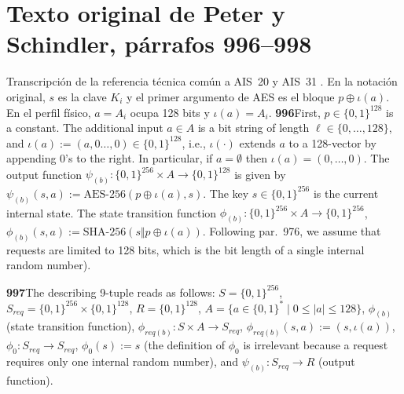 \documentclass[11pt,a4paper]{article}
\begin{document}
\section{Texto original de Peter y Schindler, párrafos 996--998}\label{app:bsi}
Transcripción de la referencia técnica común a AIS~20 y AIS~31 \cite[sec.~5.2.2, párrs.~996--998, pp.~203--204]{ais}. En la notación original, \(s\) es la clave \(K_i\) y el primer argumento de AES es el bloque \(p\oplus\iota(a)\). En el perfil físico, \(a=A_i\) ocupa 128 bits y \(\iota(a)=A_i\).
\begingroup
\small
\setlength{\parskip}{6pt}
\textbf{996} First, \(p\in\{0,1\}^{128}\) is a constant. The additional input \(a\in A\) is a bit string of length \(\ell\in\{0,\ldots,128\}\), and \(\iota(a):=(a,0\ldots,0)\in\{0,1\}^{128}\), i.e., \(\iota(\cdot)\) extends \(a\) to a 128-vector by appending 0's to the right. In particular, if \(a=\emptyset\) then \(\iota(a)=(0,\ldots,0)\). The output function \(\psi_{(b)}:\{0,1\}^{256}\times A\to\{0,1\}^{128}\) is given by \(\psi_{(b)}(s,a):=\text{AES-256}(p\oplus\iota(a),s)\). The key \(s\in\{0,1\}^{256}\) is the current internal state. The state transition function \(\phi_{(b)}:\{0,1\}^{256}\times A\to\{0,1\}^{256}\), \(\phi_{(b)}(s,a):=\text{SHA-256}(s\Vert p\oplus\iota(a))\). Following par.~976, we assume that requests are limited to 128 bits, which is the bit length of a single internal random number).

\textbf{997}\quad The describing 9-tuple reads as follows: \(S=\{0,1\}^{256}\), \(S_{\mathit{req}}=\{0,1\}^{256}\times\{0,1\}^{128}\), \(R=\{0,1\}^{128}\), \(A=\{a\in\{0,1\}^{*}\mid 0\le |a|\le 128\}\), \(\phi_{(b)}\) (state transition function), \(\phi_{\mathit{req}(b)}:S\times A\to S_{\mathit{req}}\), \(\phi_{\mathit{req}(b)}(s,a):=(s,\iota(a))\), \(\phi_0:S_{\mathit{req}}\to S_{\mathit{req}}\), \(\phi_0(s):=s\) (the definition of \(\phi_0\) is irrelevant because a request requires only one internal random number), and \(\psi_{(b)}:S_{\mathit{req}}\to R\) (output function).
\end{document}
